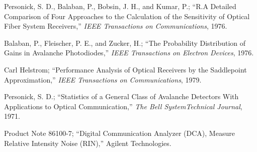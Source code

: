 \documentclass[a4paper]{article}
\begin{document}
\begin{thebibliography}{9}
 Personick, S. D., Balaban, P., Bobsin, J. H., and Kumar, P.; ``R.A Detailed Comparison of Four Approaches to the Calculation of the Sensitivity of Optical Fiber System Receivers,'' \emph{IEEE Transactions on Communications}, 1976.

 Balaban, P., Fleischer, P. E., and Zucker, H.; ``The Probability Distribution of Gains in Avalanche Photodiodes,'' \emph{IEEE Transactions on Electron Devices}, 1976.

 Carl Helstrom; ``Performance Analysis of Optical Receivers by the Saddlepoint Approximation,'' \emph{IEEE Transactions on Communications}, 1979.

 Personick, S. D.; ``Statistics of a General Class of Avalanche Detectors With Applications to Optical Communication,'' \emph{The Bell SystemTechnical Journal}, 1971.

 Product Note 86100-7; ``Digital Communication Analyzer (DCA), Measure Relative Intensity Noise (RIN),'' Agilent Technologies. 

\end{thebibliography}
\end{document}
